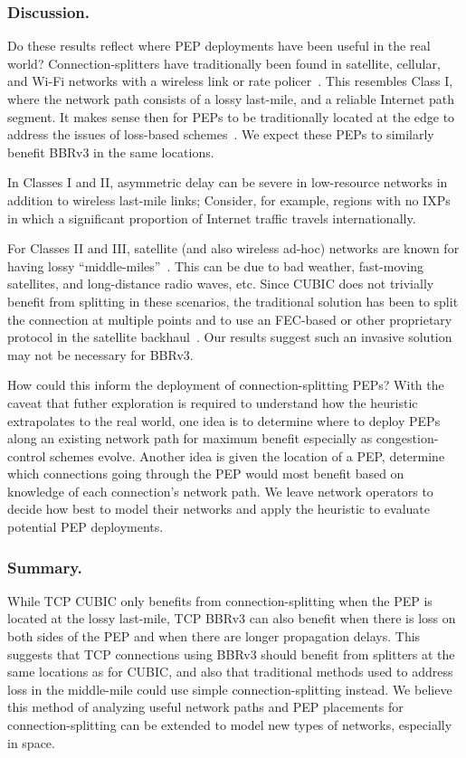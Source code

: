 \subsubsection{Discussion.}
Do these results reflect where PEP deployments have been useful in the real
world? Connection-splitters have traditionally been found in satellite,
cellular, and Wi-Fi networks with a wireless link or rate policer~\cite
{edeline2019bottomup,honda2011still}. This resembles Class I, where the
network path consists of a lossy last-mile, and a reliable Internet path
segment. It makes sense then for PEPs to be traditionally located at the edge
to address the issues of loss-based schemes~\cite
{cloudsplitting2010,rfc3135,farkas2012splittcp}. We expect these PEPs to
similarly benefit BBRv3 in the same locations.

In Classes I and II, asymmetric delay can be severe in low-resource networks
in addition to wireless last-mile links;
Consider, for example, regions with no IXPs in which a significant proportion
of Internet traffic travels internationally.

For Classes II and III, satellite (and also wireless ad-hoc)
networks are known for
having lossy ``middle-miles''~\cite{kuhn2021quic-over-sat,border2020evaluating,pirovano2013new,cloudsplitting2010}.
This can be due to bad weather, fast-moving satellites, and
long-distance radio waves, etc.
Since CUBIC does not trivially benefit from splitting in these scenarios, the
traditional solution has been to split the connection at multiple points and to
use an FEC-based or other proprietary protocol in the satellite backhaul~\cite
{cloudsplitting2010,border2020evaluating,rfc3135}.
Our results suggest such an invasive solution may not be necessary for BBRv3.

How could this inform the deployment of connection-splitting PEPs?
With the caveat that futher exploration is required to understand how the
heuristic extrapolates to the real world, one idea is to
determine where to deploy PEPs along an existing network path for maximum
benefit especially as congestion-control schemes evolve.
Another idea is given the location of a PEP, determine which connections going
through the PEP would most benefit based on knowledge of each connection's
network path.
We leave network operators to decide how best to model their networks and apply
the heuristic to evaluate potential PEP deployments.

\subsubsection{Summary.}
While TCP CUBIC only benefits from connection-splitting when the PEP is located
at the lossy last-mile, TCP BBRv3 can also benefit when there is loss on both
sides of the PEP and when there are longer propagation delays. This suggests
that TCP connections using BBRv3 should benefit from splitters at the same
locations as for CUBIC, and also that traditional methods used to
address loss in the middle-mile could use simple connection-splitting instead.
We believe this method of analyzing useful network paths and PEP placements for
connection-splitting can be extended to model new types of networks, especially
in space.

